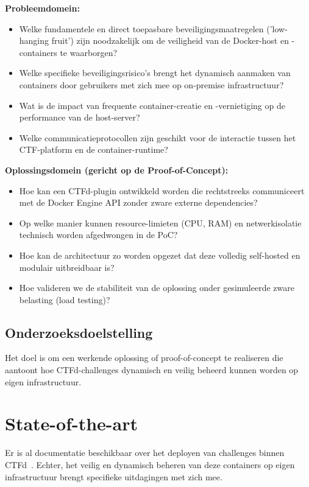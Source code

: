 \textbf{Probleemdomein:}
\begin{itemize}
	\item Welke fundamentele en direct toepasbare beveiligingsmaatregelen ('low-hanging fruit') zijn noodzakelijk om de veiligheid van de Docker-host en -containers te waarborgen?
	\item Welke specifieke beveiligingsrisico's brengt het dynamisch aanmaken van containers door gebruikers met zich mee op on-premise infrastructuur?
	\item Wat is de impact van frequente container-creatie en -vernietiging op de performance van de host-server?
	\item Welke communicatieprotocollen zijn geschikt voor de interactie tussen het CTF-platform en de container-runtime?
\end{itemize}

\textbf{Oplossingsdomein (gericht op de Proof-of-Concept):}
\begin{itemize}
	\item Hoe kan een CTFd-plugin ontwikkeld worden die rechtstreeks communiceert met de Docker Engine API zonder zware externe dependencies?
	\item Op welke manier kunnen resource-limieten (CPU, RAM) en netwerkisolatie technisch worden afgedwongen in de PoC?
	\item Hoe kan de architectuur zo worden opgezet dat deze volledig self-hosted en modulair uitbreidbaar is?
	\item Hoe valideren we de stabiliteit van de oplossing onder gesimuleerde zware belasting (load testing)?
\end{itemize}

\subsection{Onderzoeksdoelstelling}
Het doel is om een werkende oplossing of proof-of-concept te realiseren die aantoont hoe CTFd-challenges dynamisch en veilig beheerd kunnen worden op eigen infrastructuur.


\section{State-of-the-art}%
\label{sec:state-of-the-art}

Er is al documentatie beschikbaar over het deployen van challenges binnen CTFd~\autocite{CTFd}. Echter, het veilig en dynamisch beheren van deze containers op eigen infrastructuur brengt specifieke uitdagingen met zich mee.

